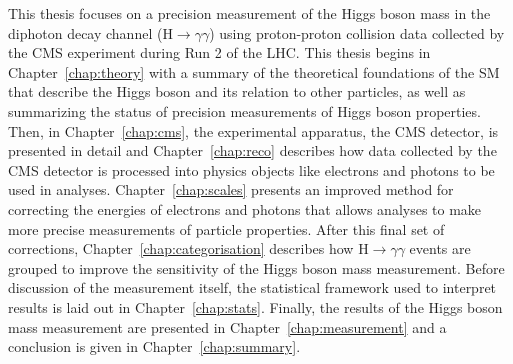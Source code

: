 This thesis focuses on a precision measurement of the Higgs boson mass in the diphoton decay channel (H$\rightarrow\gamma\gamma$) using proton-proton collision data collected by the CMS experiment during Run 2 of the LHC. This thesis begins in Chapter~\ref{chap:theory} with a summary of the theoretical foundations of the SM that describe the Higgs boson and its relation to other particles, as well as summarizing the status of precision measurements of Higgs boson properties. Then, in Chapter~\ref{chap:cms}, the experimental apparatus, the CMS detector, is presented in detail and Chapter~\ref{chap:reco} describes how data collected by the CMS detector is processed into physics objects like electrons and photons to be used in analyses. Chapter~\ref{chap:scales} presents an improved method for correcting the energies of electrons and photons that allows analyses to make more precise measurements of particle properties. After this final set of corrections, Chapter~\ref{chap:categorisation} describes how H$\rightarrow\gamma\gamma$ events are grouped to improve the sensitivity of the Higgs boson mass measurement. Before discussion of the measurement itself, the statistical framework used to interpret results is laid out in Chapter~\ref{chap:stats}. Finally, the results of the Higgs boson mass measurement are presented in Chapter~\ref{chap:measurement} and a conclusion is given in Chapter~\ref{chap:summary}. 

